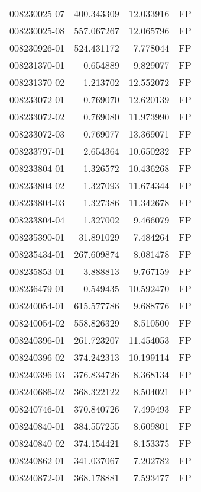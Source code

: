 \begin{tabular}{lrrl}
008230025-07 &  400.343309 &      12.033916 &   FP \\
008230025-08 &  557.067267 &      12.065796 &   FP \\
008230926-01 &  524.431172 &       7.778044 &   FP \\
008231370-01 &    0.654889 &       9.829077 &   FP \\
008231370-02 &    1.213702 &      12.552072 &   FP \\
008233072-01 &    0.769070 &      12.620139 &   FP \\
008233072-02 &    0.769080 &      11.973990 &   FP \\
008233072-03 &    0.769077 &      13.369071 &   FP \\
008233797-01 &    2.654364 &      10.650232 &   FP \\
008233804-01 &    1.326572 &      10.436268 &   FP \\
008233804-02 &    1.327093 &      11.674344 &   FP \\
008233804-03 &    1.327386 &      11.342678 &   FP \\
008233804-04 &    1.327002 &       9.466079 &   FP \\
008235390-01 &   31.891029 &       7.484264 &   FP \\
008235434-01 &  267.609874 &       8.081478 &   FP \\
008235853-01 &    3.888813 &       9.767159 &   FP \\
008236479-01 &    0.549435 &      10.592470 &   FP \\
008240054-01 &  615.577786 &       9.688776 &   FP \\
008240054-02 &  558.826329 &       8.510500 &   FP \\
008240396-01 &  261.723207 &      11.454053 &   FP \\
008240396-02 &  374.242313 &      10.199114 &   FP \\
008240396-03 &  376.834726 &       8.368134 &   FP \\
008240686-02 &  368.322122 &       8.504021 &   FP \\
008240746-01 &  370.840726 &       7.499493 &   FP \\
008240840-01 &  384.557255 &       8.609801 &   FP \\
008240840-02 &  374.154421 &       8.153375 &   FP \\
008240862-01 &  341.037067 &       7.202782 &   FP \\
008240872-01 &  368.178881 &       7.593477 &   FP \\

\end{tabular}
